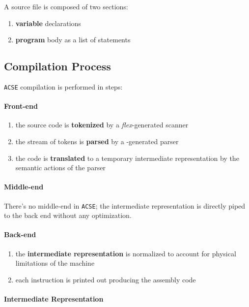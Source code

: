 A \lance source file is composed of two sections:

\begin{enumerate}
  \item \textbf{variable} declarations
  \item \textbf{program} body as a list of statements
\end{enumerate}

\subsection{Compilation Process}

\texttt{ACSE} compilation is performed in steps:

\paragraph*{Front-end}
\begin{enumerate}
  \item the source code is \textbf{tokenized} by a \textit{flex}-generated scanner
  \item the stream of tokens is \textbf{parsed} by a \bison-generated parser
  \item the code is \textbf{translated} to a temporary intermediate representation by the semantic actions of the parser
\end{enumerate}

\paragraph*{Middle-end}
There's no middle-end in \texttt{ACSE}; the intermediate representation is directly piped to the back end without any optimization.

\paragraph*{Back-end}
\begin{enumerate}
  \item the \textbf{intermediate representation} is normalized to account for physical limitations of the \mace machine
  \item each instruction is printed out producing the \mace assembly code
\end{enumerate}

\paragraph{Intermediate Representation}

